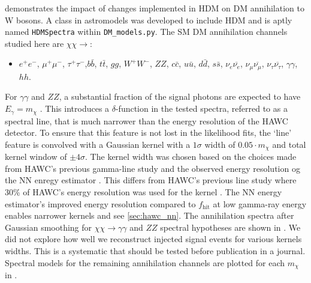  demonstrates the impact of changes implemented in HDM on DM
annihilation to W bosons.
A class in astromodels was developed to include HDM and is aptly named \texttt{HDMSpectra} within \texttt{DM\_models.py}.
The SM DM annihilation channels studied here are $\chi\chi \rightarrow$:
\begin{itemize}
    \item[] $e^+e^-$, $\mu^+\mu^-$, $\tau^+\tau^-$,$b\bar{b}$, $t\bar{t}$, $gg$, $W^+W^-$, $ZZ$, $c\bar{c}$, $u\bar{u}$, $d\bar{d}$, $s\bar{s}$, $\nu_e \overline{\nu_e}$, $\nu_\mu \overline{\nu_\mu}$, $\nu_\tau \overline{\nu_\tau}$, $\gamma\gamma$, $hh$.
\end{itemize}
For $\gamma\gamma$ and $ZZ$, a substantial fraction of the signal photons are expected to have $E_\gamma = m_\chi$ \cite{HDMSpectra}.
This introduces a $\delta$-function in the tested spectra, referred to as a spectral line, that is much narrower than the energy resolution of the HAWC detector.
To ensure that this feature is not lost in the likelihood fits, the `line' feature is convolved with a Gaussian kernel with a $1\sigma$ width of $0.05 \cdot m_\chi$ and total kernel window of $\pm4\sigma$.
The kernel width was chosen based on the choices made from HAWC's previous gamma-line study \cite{HAWC_dm_gammalines} and the observed energy resolution og the NN enregy estimator \cite{100TEV_Crab_HAWC}.
This differs from HAWC's previous line study where 30\% of HAWC's energy resolution was used for the kernel \cite{HAWC_dm_gammalines}.
The NN energy estimator's improved energy resolution compared to $f_\mathrm{hit}$ at low gamma-ray energy enables narrower kernels \cite{HDMSpectra} and see \cref{sec:hawc_nn}.
The annihilation spectra after Gaussian smoothing for $\chi\chi \rightarrow \gamma\gamma$ and $ZZ$ spectral hypotheses are shown in .
We did not explore how well we reconstruct injected signal events for various kernels widths.
This is a systematic that should be tested before publication in a journal.
Spectral models for the remaining annihilation channels are plotted for each $m_\chi$ in .


